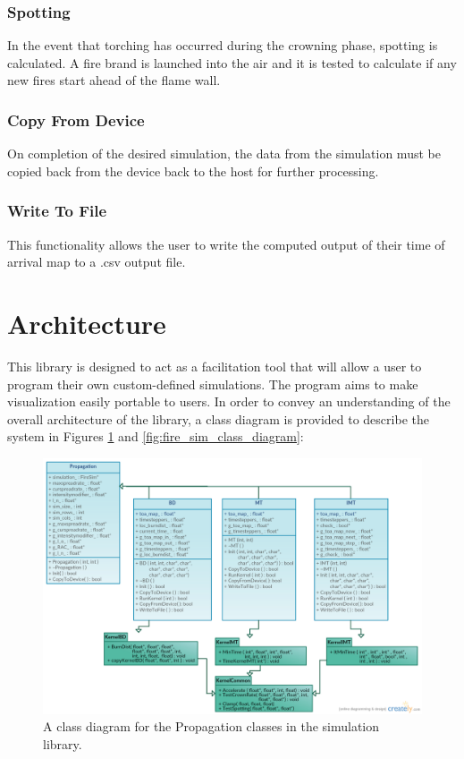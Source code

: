 \subsubsection{Spotting}
In the event that torching has occurred during the crowning phase, spotting is calculated. A fire brand is launched into the air and it is tested to calculate if any new fires start ahead of the flame wall.

\subsubsection{Copy From Device}
On completion of the desired simulation, the data from the simulation must be copied back from the device back to the host for further processing. 

\subsubsection{Write To File}
This functionality allows the user to write the computed output of their time of arrival map to a .csv output file. 

\section{Architecture}
This library is designed to act as a facilitation tool that will allow a user to program their own custom-defined simulations. The program aims to make visualization easily portable to users. In order to convey an understanding of the overall architecture of the library, a class diagram is provided to describe the system in Figures \ref{fig:class_diagram} and \ref{fig:fire_sim_class_diagram}:

\begin{figure}
    \centering
    \includegraphics[width=\textwidth,keepaspectratio]{figures/design/class_diagram.png}
    \caption{A class diagram for the Propagation classes in the simulation library.}
    \label{fig:class_diagram}
\end{figure}

